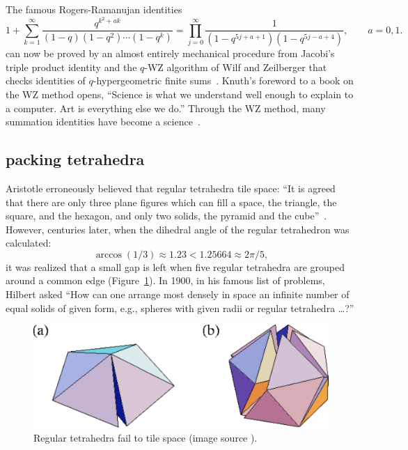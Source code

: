 \documentclass{llncs}
\begin{document}
The famous Rogers-Ramanujan identities
\[
1 + \sum_{k=1}^\infty \frac{q^{k^2+a k}}{(1-q)(1-q^2)\cdots (1-q^k)} = 
\prod_{j=0}^\infty \frac{1}{(1-q^{5j+a+1})(1- q^{5j - a +4})},
\qquad a = 0,1.
\]
can now be proved by an almost entirely mechanical procedure from
Jacobi's triple product identity and the $q$-WZ algorithm of Wilf and
Zeilberger that checks identities of $q$-hypergeometric finite
sums~\cite{PP94}.   Knuth's foreword to a book
on the WZ method opens, ``Science is what we understand well enough to
explain to a computer. Art is everything else we do.'' Through the WZ
method, many summation identities have become a science~\cite{PWZ}.


\subsection{packing  tetrahedra}

Aristotle erroneously believed that regular tetrahedra tile space:
``It is agreed that there are only three plane figures which can fill
a space, the triangle, the square, and the hexagon, and only two
solids, the pyramid and the cube''~\cite{Aristotle}.  However,
centuries later, when the dihedral angle of the regular tetrahedron
was calculated:
\[
\arccos(1/3) \approx 1.23 < 1.25664 \approx 2\pi/5,
\]
it was realized that a small gap is left when five regular tetrahedra
are grouped around a common edge (Figure~\ref{fig:gap}).  In 1900, in
his famous list of problems, Hilbert asked ``How can one arrange most
densely in space an infinite number of equal solids of given form,
e.g., spheres with given radii or regular tetrahedra \dots?''

\begin{figure}[h!]
  \centering
\includegraphics[scale=0.3]{tetrahedral_defect.pdf}
  \caption{Regular tetrahedra fail to tile space (image source \cite{tetrahedra}).}
\label{fig:gap}
\end{figure}
\end{document}
